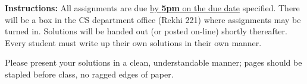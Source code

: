 \documentclass[12pt,addpoints]{exam}
\begin{document}
\extrawidth{0.5in} \extrafootheight{-0in} \pagestyle{headandfoot}
\headrule {} \footrule {}

\noindent \textbf{Instructions:} All assignments are due \underline{by \textbf{5pm} on the due date} specified.  There will be a box in the CS department office (Rekhi 221) where assignments may be turned in.  Solutions will be handed out (or posted on-line) shortly thereafter.  Every student
must write up their own solutions in their own manner.

\smallskip
\noindent Please present your solutions in a clean, understandable
manner; pages should be stapled before class, no ragged edges of
paper.
\end{document}
